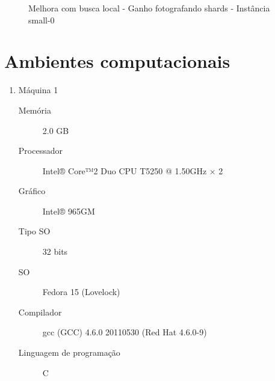 \documentclass[11pt,letterpaper]{article}
\begin{document}
\begin{figure}[h!]
  \begin{center}
  \end{center}
  \caption{Melhora com busca local - Ganho fotografando shards - Instância small-0}
  \label{graf:small}
\end{figure}

\section{Ambientes computacionais}
\begin{enumerate}
\item Máquina 1

  \begin{description}
  \item[Memória]2.0 GB
  \item[Processador]  Intel® Core™2 Duo CPU T5250 @ 1.50GHz × 2
  \item[Gráfico] Intel® 965GM   
  \item[Tipo SO] 32 bits   
  \item[SO] Fedora 15 (Lovelock)   
  \item[Compilador] gcc (GCC) 4.6.0 20110530 (Red Hat 4.6.0-9)
  \item[Linguagem de programação] C
  \end{description}

\end{enumerate}

% 
%   
\end{document}
